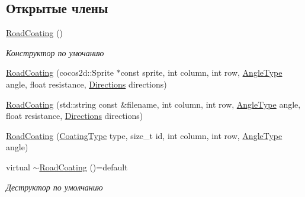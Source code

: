 \subsection*{Открытые члены}
\begin{DoxyCompactItemize}
\item 
\mbox{\label{classrtm_1_1_road_coating_a0069c9e169fd982c4b5a5fa7f00145c6}} 
\hyperlink{classrtm_1_1_road_coating_a0069c9e169fd982c4b5a5fa7f00145c6}{Road\+Coating} ()
\begin{DoxyCompactList}\small\item\em Конструктор по умочанию \end{DoxyCompactList}\item 
\hyperlink{classrtm_1_1_road_coating_a3daed8c05e6901a8e2aedd5bd8b10e88}{Road\+Coating} (cocos2d\+::\+Sprite $\ast$const sprite, int column, int row, \hyperlink{namespacertm_a69dc82b16a0148c10962caa83d930f89}{Angle\+Type} angle, float resistance, \hyperlink{namespacertm_a4776fbfe59834ff1a16838ad6735b69a}{Directions} directions)
\item 
\hyperlink{classrtm_1_1_road_coating_ab127c8e986544a6e8bdf95ed8f302b7e}{Road\+Coating} (std\+::string const \&filename, int column, int row, \hyperlink{namespacertm_a69dc82b16a0148c10962caa83d930f89}{Angle\+Type} angle, float resistance, \hyperlink{namespacertm_a4776fbfe59834ff1a16838ad6735b69a}{Directions} directions)
\item 
\hyperlink{classrtm_1_1_road_coating_a0734f50e7884ed3cad83d0a6a16d663e}{Road\+Coating} (\hyperlink{namespacertm_aecd3929e64cd461eb3555b611f6fad95}{Coating\+Type} type, size\+\_\+t id, int column, int row, \hyperlink{namespacertm_a69dc82b16a0148c10962caa83d930f89}{Angle\+Type} angle)
\item 
\mbox{\label{classrtm_1_1_road_coating_a49f9bc08088af98a0cccdf8db296ba0f}} 
virtual \hyperlink{classrtm_1_1_road_coating_a49f9bc08088af98a0cccdf8db296ba0f}{$\sim$\+Road\+Coating} ()=default
\begin{DoxyCompactList}\small\item\em Деструктор по умолчанию \end{DoxyCompactList}\end{DoxyCompactItemize}

